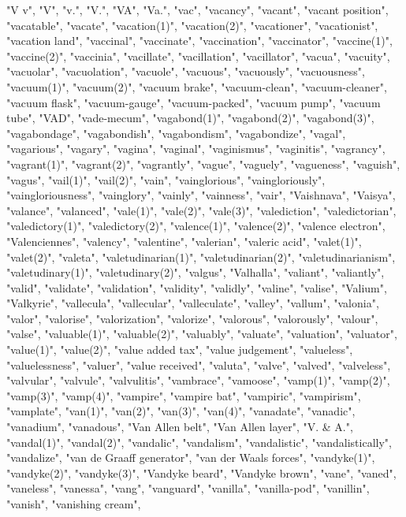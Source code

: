 "V v",
"V",
"v.",
"V.",
"VA",
"Va.",
"vac",
"vacancy",
"vacant",
"vacant position",
"vacatable",
"vacate",
"vacation(1)",
"vacation(2)",
"vacationer",
"vacationist",
"vacation land",
"vaccinal",
"vaccinate",
"vaccination",
"vaccinator",
"vaccine(1)",
"vaccine(2)",
"vaccinia",
"vacillate",
"vacillation",
"vacillator",
"vacua",
"vacuity",
"vacuolar",
"vacuolation",
"vacuole",
"vacuous",
"vacuously",
"vacuousness",
"vacuum(1)",
"vacuum(2)",
"vacuum brake",
"vacuum-clean",
"vacuum-cleaner",
"vacuum flask",
"vacuum-gauge",
"vacuum-packed",
"vacuum pump",
"vacuum tube",
"VAD",
"vade-mecum",
"vagabond(1)",
"vagabond(2)",
"vagabond(3)",
"vagabondage",
"vagabondish",
"vagabondism",
"vagabondize",
"vagal",
"vagarious",
"vagary",
"vagina",
"vaginal",
"vaginismus",
"vaginitis",
"vagrancy",
"vagrant(1)",
"vagrant(2)",
"vagrantly",
"vague",
"vaguely",
"vagueness",
"vaguish",
"vagus",
"vail(1)",
"vail(2)",
"vain",
"vainglorious",
"vaingloriously",
"vaingloriousness",
"vainglory",
"vainly",
"vainness",
"vair",
"Vaishnava",
"Vaisya",
"valance",
"valanced",
"vale(1)",
"vale(2)",
"vale(3)",
"valediction",
"valedictorian",
"valedictory(1)",
"valedictory(2)",
"valence(1)",
"valence(2)",
"valence electron",
"Valenciennes",
"valency",
"valentine",
"valerian",
"valeric acid",
"valet(1)",
"valet(2)",
"valeta",
"valetudinarian(1)",
"valetudinarian(2)",
"valetudinarianism",
"valetudinary(1)",
"valetudinary(2)",
"valgus",
"Valhalla",
"valiant",
"valiantly",
"valid",
"validate",
"validation",
"validity",
"validly",
"valine",
"valise",
"Valium",
"Valkyrie",
"vallecula",
"vallecular",
"valleculate",
"valley",
"vallum",
"valonia",
"valor",
"valorise",
"valorization",
"valorize",
"valorous",
"valorously",
"valour",
"valse",
"valuable(1)",
"valuable(2)",
"valuably",
"valuate",
"valuation",
"valuator",
"value(1)",
"value(2)",
"value added tax",
"value judgement",
"valueless",
"valuelessness",
"valuer",
"value received",
"valuta",
"valve",
"valved",
"valveless",
"valvular",
"valvule",
"valvulitis",
"vambrace",
"vamoose",
"vamp(1)",
"vamp(2)",
"vamp(3)",
"vamp(4)",
"vampire",
"vampire bat",
"vampiric",
"vampirism",
"vamplate",
"van(1)",
"van(2)",
"van(3)",
"van(4)",
"vanadate",
"vanadic",
"vanadium",
"vanadous",
"Van Allen belt",
"Van Allen layer",
"V. \& A.",
"vandal(1)",
"vandal(2)",
"vandalic",
"vandalism",
"vandalistic",
"vandalistically",
"vandalize",
"van de Graaff generator",
"van der Waals forces",
"vandyke(1)",
"vandyke(2)",
"vandyke(3)",
"Vandyke beard",
"Vandyke brown",
"vane",
"vaned",
"vaneless",
"vanessa",
"vang",
"vanguard",
"vanilla",
"vanilla-pod",
"vanillin",
"vanish",
"vanishing cream",
